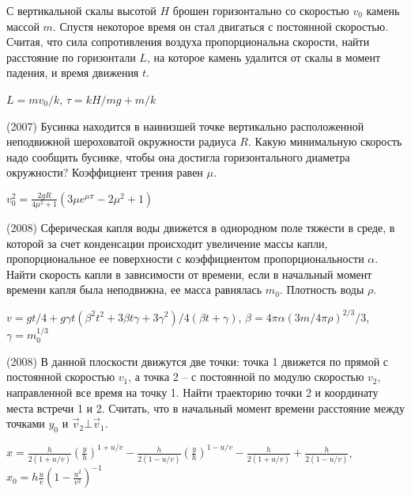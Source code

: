\begin{ex}
С вертикальной скалы высотой $H$ брошен горизонтально со скоростью $v_0$ камень массой $m$. Спустя некоторое время он стал двигаться с постоянной скоростью. Считая, что сила сопротивления воздуха пропорциональна скорости, найти расстояние по горизонтали $L$, на которое камень удалится от скалы в момент падения, и время движения $t$.
\begin{ans}
$L = mv_0/k$, $\tau = kH/mg + m/k$
\end{ans}
\end{ex}

\begin{ex}
(2007) Бусинка находится в наинизшей точке вертикально расположенной неподвижной шероховатой окружности радиуса $R$. Какую минимальную скорость надо сообщить бусинке, чтобы она достигла горизонтального диаметра окружности? Коэффициент трения равен $\mu$.
\begin{ans}
$v_0^2 = \frac{2gR}{4\mu^2+1}\left( 3\mu e^{\mu \pi} - 2\mu^2 +1\right)$
\end{ans}
\end{ex}

\begin{ex}
(2008) Сферическая капля воды движется в однородном поле тяжести в среде, в которой за счет конденсации происходит увеличение массы капли, пропорциональное ее поверхности с коэффициентом пропорциональности $\alpha$. Найти скорость капли в зависимости от времени, если в начальный момент времени капля была неподвижна, ее масса равнялась $m_0$. Плотность воды $\rho$.
\begin{ans}
$v=gt/4+g\gamma t (\beta^2t^2+3\beta t \gamma+3\gamma^2)/4(\beta t + \gamma)$, $\beta = 4\pi \alpha(3m/4\pi\rho)^{2/3}/3$, $\gamma = m_0^{1/3}$
\end{ans}
\end{ex}

\begin{ex} (2008) В данной плоскости движутся две точки: точка 1 движется по прямой с постоянной скоростью $v_1$, а точка 2 – с постоянной по модулю скоростью $v_2$, направленной все время на точку 1. Найти траекторию точки 2 и координату места встречи 1 и 2. Считать, что в начальный момент времени расстояние между точками $y_0$ и $\vec{v}_2 \bot \vec{v}_1$.
\begin{ans}
$x=\frac{h}{2(1+u/v)}(\frac{y}{h})^{1+u/v} - \frac{h}{2(1-u/v)}(\frac{y}{h})^{1-u/v} - \frac{h}{2(1+u/v)}+\frac{h}{2(1-u/v)}$, $x_0=h\frac{u}{v}\left(1-\frac{u^2}{v^2}\right)^{-1}$
\end{ans}
\end{ex}